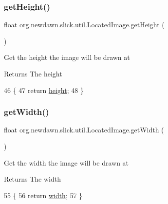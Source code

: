 \subsubsection{\texorpdfstring{get\+Height()}{getHeight()}}
{\footnotesize\ttfamily float org.\+newdawn.\+slick.\+util.\+Located\+Image.\+get\+Height (\begin{DoxyParamCaption}{ }\end{DoxyParamCaption})\hspace{0.3cm}{\ttfamily [inline]}}

Get the height the image will be drawn at

\begin{DoxyReturn}{Returns}
The height 
\end{DoxyReturn}

\begin{DoxyCode}
46                              \{
47         \textcolor{keywordflow}{return} \mbox{\hyperlink{classorg_1_1newdawn_1_1slick_1_1util_1_1_located_image_abeb19801d483aa7fdd249c15c535edaf}{height}};
48     \}
\end{DoxyCode}
\mbox{\label{classorg_1_1newdawn_1_1slick_1_1util_1_1_located_image_af2573c7797bcc21b244c85923bad388d}} 
\subsubsection{\texorpdfstring{get\+Width()}{getWidth()}}
{\footnotesize\ttfamily float org.\+newdawn.\+slick.\+util.\+Located\+Image.\+get\+Width (\begin{DoxyParamCaption}{ }\end{DoxyParamCaption})\hspace{0.3cm}{\ttfamily [inline]}}

Get the width the image will be drawn at

\begin{DoxyReturn}{Returns}
The width 
\end{DoxyReturn}

\begin{DoxyCode}
55                             \{
56         \textcolor{keywordflow}{return} \mbox{\hyperlink{classorg_1_1newdawn_1_1slick_1_1util_1_1_located_image_a26063411818a274d3ce90c93185e44ac}{width}};
57     \}
\end{DoxyCode}
\mbox{\label{classorg_1_1newdawn_1_1slick_1_1util_1_1_located_image_af4206a2699608e6be51722f7e457039b}} 
